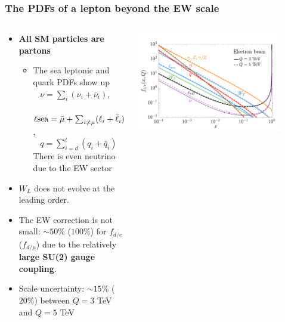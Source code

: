 \documentclass[aspectratio=169]{beamer}
\begin{document}
\begin{frame}
	\frametitle{The PDFs of a lepton beyond the EW scale}
	\begin{columns}
		\begin{column}{0.6\textwidth}
			\begin{itemize}
				\item \textcolor{PittRoyal}{\bf All SM particles are partons}\\
				\begin{itemize}
					\item The sea leptonic and quark PDFs show up\\~
					$\nu=\sum_{i}(\nu_i+\bar{\nu}_i)$,\\~
					$\ell{\textrm{sea}}=\bar{\mu}+\sum_{i\neq\mu}(\ell_i+\bar{\ell}_i)$,\\~ 
					$q=\sum_{i=d}^t(q_i+\bar{q}_i)$\\
					\textcolor{PittRoyal}{There is even neutrino due to the EW sector}	
					\end{itemize}
				\item $W_L$ does not evolve at the leading order. 
				\item The EW correction is not small:
				$\sim 50\%$ ($100\%$) for $f_{d/e}$ ($f_{d/\mu}$) due to the relatively {\bf large SU(2) gauge coupling}. 
				\item Scale uncertainty: $\sim 15\%$ ($20\%$) between $Q=3$ TeV and $Q=5$ TeV \\
			\end{itemize}
		\end{column}
		\begin{column}{0.45\textwidth}
		\includegraphics[width=0.85\textwidth]{figs/EWPDFe.pdf}

\end{column}
\end{columns}
\end{frame}
\end{document}
